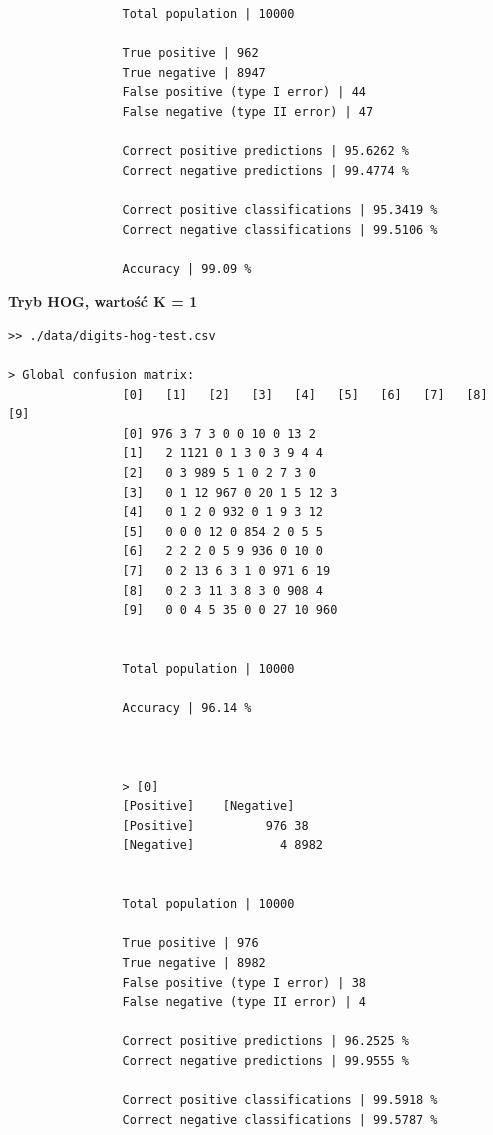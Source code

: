 \documentclass{classrep}
\begin{document}
{{{\begin{lstlisting}
                Total population | 10000

                True positive | 962
                True negative | 8947
                False positive (type I error) | 44
                False negative (type II error) | 47

                Correct positive predictions | 95.6262 %
                Correct negative predictions | 99.4774 %

                Correct positive classifications | 95.3419 %
                Correct negative classifications | 99.5106 %

                Accuracy | 99.09 %

                \end{lstlisting}
                \textbf{Tryb HOG, wartość K = 1}
                \begin{lstlisting}
>> ./data/digits-hog-test.csv

> Global confusion matrix:
                [0]   [1]   [2]   [3]   [4]   [5]   [6]   [7]   [8]  [9]
                [0] 976 3 7 3 0 0 10 0 13 2
                [1]   2 1121 0 1 3 0 3 9 4 4
                [2]   0 3 989 5 1 0 2 7 3 0
                [3]   0 1 12 967 0 20 1 5 12 3
                [4]   0 1 2 0 932 0 1 9 3 12
                [5]   0 0 0 12 0 854 2 0 5 5
                [6]   2 2 2 0 5 9 936 0 10 0
                [7]   0 2 13 6 3 1 0 971 6 19
                [8]   0 2 3 11 3 8 3 0 908 4
                [9]   0 0 4 5 35 0 0 27 10 960


                Total population | 10000

                Accuracy | 96.14 %



                > [0]
                [Positive]    [Negative]
                [Positive]          976 38
                [Negative]            4 8982


                Total population | 10000

                True positive | 976
                True negative | 8982
                False positive (type I error) | 38
                False negative (type II error) | 4

                Correct positive predictions | 96.2525 %
                Correct negative predictions | 99.9555 %

                Correct positive classifications | 99.5918 %
                Correct negative classifications | 99.5787 %


\end{lstlisting}}}}
\end{document}
